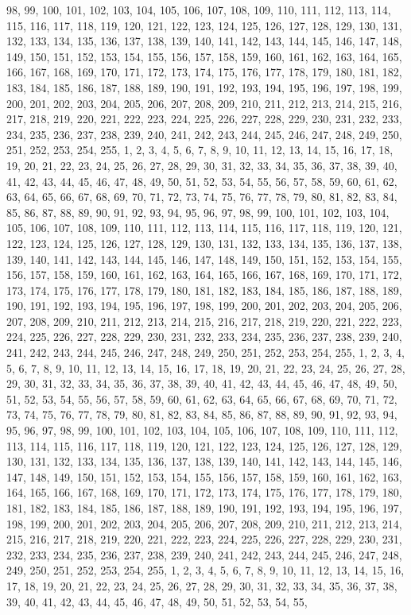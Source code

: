 98, 99, 100, 101, 102, 103, 104, 105, 106, 107, 108, 109, 110, 111, 112, 113, 114, 115, 116, 117, 118, 119, 120, 121, 122, 123, 124, 125, 126, 127, 128, 129, 130, 131, 132, 133, 134, 135, 136, 137, 138, 139, 140, 141, 142, 143, 144, 145, 146, 147, 148, 149, 150, 151, 152, 153, 154, 155, 156, 157, 158, 159, 160, 161, 162, 163, 164, 165, 166, 167, 168, 169, 170, 171, 172, 173, 174, 175, 176, 177, 178, 179, 180, 181, 182, 183, 184, 185, 186, 187, 188, 189, 190, 191, 192, 193, 194, 195, 196, 197, 198, 199, 200, 201, 202, 203, 204, 205, 206, 207, 208, 209, 210, 211, 212, 213, 214, 215, 216, 217, 218, 219, 220, 221, 222, 223, 224, 225, 226, 227, 228, 229, 230, 231, 232, 233, 234, 235, 236, 237, 238, 239, 240, 241, 242, 243, 244, 245, 246, 247, 248, 249, 250, 251, 252, 253, 254, 255, 1, 2, 3, 4, 5, 6, 7, 8, 9, 10, 11, 12, 13, 14, 15, 16, 17, 18, 19, 20, 21, 22, 23, 24, 25, 26, 27, 28, 29, 30, 31, 32, 33, 34, 35, 36, 37, 38, 39, 40, 41, 42, 43, 44, 45, 46, 47, 48, 49, 50, 51, 52, 53, 54, 55, 56, 57, 58, 59, 60, 61, 62, 63, 64, 65, 66, 67, 68, 69, 70, 71, 72, 73, 74, 75, 76, 77, 78, 79, 80, 81, 82, 83, 84, 85, 86, 87, 88, 89, 90, 91, 92, 93, 94, 95, 96, 97, 98, 99, 100, 101, 102, 103, 104, 105, 106, 107, 108, 109, 110, 111, 112, 113, 114, 115, 116, 117, 118, 119, 120, 121, 122, 123, 124, 125, 126, 127, 128, 129, 130, 131, 132, 133, 134, 135, 136, 137, 138, 139, 140, 141, 142, 143, 144, 145, 146, 147, 148, 149, 150, 151, 152, 153, 154, 155, 156, 157, 158, 159, 160, 161, 162, 163, 164, 165, 166, 167, 168, 169, 170, 171, 172, 173, 174, 175, 176, 177, 178, 179, 180, 181, 182, 183, 184, 185, 186, 187, 188, 189, 190, 191, 192, 193, 194, 195, 196, 197, 198, 199, 200, 201, 202, 203, 204, 205, 206, 207, 208, 209, 210, 211, 212, 213, 214, 215, 216, 217, 218, 219, 220, 221, 222, 223, 224, 225, 226, 227, 228, 229, 230, 231, 232, 233, 234, 235, 236, 237, 238, 239, 240, 241, 242, 243, 244, 245, 246, 247, 248, 249, 250, 251, 252, 253, 254, 255, 1, 2, 3, 4, 5, 6, 7, 8, 9, 10, 11, 12, 13, 14, 15, 16, 17, 18, 19, 20, 21, 22, 23, 24, 25, 26, 27, 28, 29, 30, 31, 32, 33, 34, 35, 36, 37, 38, 39, 40, 41, 42, 43, 44, 45, 46, 47, 48, 49, 50, 51, 52, 53, 54, 55, 56, 57, 58, 59, 60, 61, 62, 63, 64, 65, 66, 67, 68, 69, 70, 71, 72, 73, 74, 75, 76, 77, 78, 79, 80, 81, 82, 83, 84, 85, 86, 87, 88, 89, 90, 91, 92, 93, 94, 95, 96, 97, 98, 99, 100, 101, 102, 103, 104, 105, 106, 107, 108, 109, 110, 111, 112, 113, 114, 115, 116, 117, 118, 119, 120, 121, 122, 123, 124, 125, 126, 127, 128, 129, 130, 131, 132, 133, 134, 135, 136, 137, 138, 139, 140, 141, 142, 143, 144, 145, 146, 147, 148, 149, 150, 151, 152, 153, 154, 155, 156, 157, 158, 159, 160, 161, 162, 163, 164, 165, 166, 167, 168, 169, 170, 171, 172, 173, 174, 175, 176, 177, 178, 179, 180, 181, 182, 183, 184, 185, 186, 187, 188, 189, 190, 191, 192, 193, 194, 195, 196, 197, 198, 199, 200, 201, 202, 203, 204, 205, 206, 207, 208, 209, 210, 211, 212, 213, 214, 215, 216, 217, 218, 219, 220, 221, 222, 223, 224, 225, 226, 227, 228, 229, 230, 231, 232, 233, 234, 235, 236, 237, 238, 239, 240, 241, 242, 243, 244, 245, 246, 247, 248, 249, 250, 251, 252, 253, 254, 255, 1, 2, 3, 4, 5, 6, 7, 8, 9, 10, 11, 12, 13, 14, 15, 16, 17, 18, 19, 20, 21, 22, 23, 24, 25, 26, 27, 28, 29, 30, 31, 32, 33, 34, 35, 36, 37, 38, 39, 40, 41, 42, 43, 44, 45, 46, 47, 48, 49, 50, 51, 52, 53, 54, 55, 